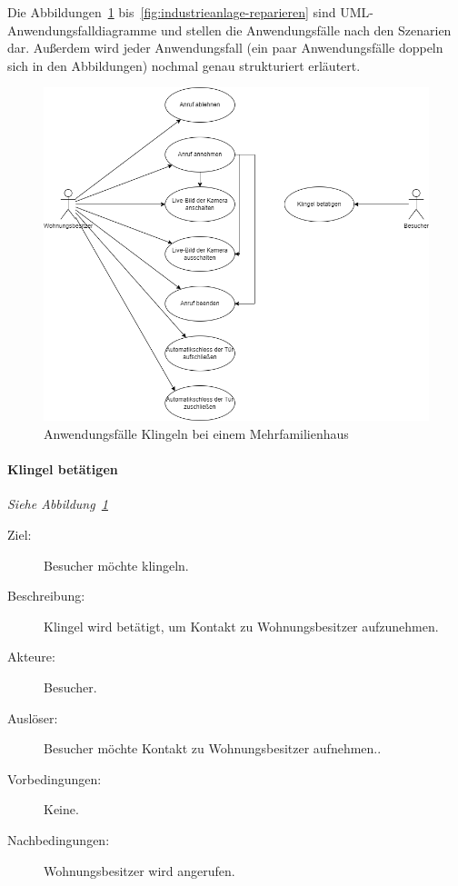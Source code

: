 Die Abbildungen~\ref{fig:klingeln-bei-einem-mehrfamilienhaus} bis~\ref{fig:industrieanlage-reparieren} sind UML-Anwendungsfalldiagramme und stellen die Anwendungsfälle nach den Szenarien dar.
Außerdem wird jeder Anwendungsfall (ein paar Anwendungsfälle doppeln sich in den Abbildungen) nochmal genau strukturiert erläutert.

\begin{figure}[ht!]
    \centering
    \includegraphics[width=\paperwidth-2in]{../assets/img/UML-Anwendungsfalldiagramme-Klingeln bei einem Mehrfamilienhaus}
    \caption{Anwendungsfälle Klingeln bei einem Mehrfamilienhaus}
    \label{fig:klingeln-bei-einem-mehrfamilienhaus}
\end{figure}

\paragraph{\large{Klingel betätigen}}
\textit{Siehe Abbildung~\ref{fig:klingeln-bei-einem-mehrfamilienhaus}}
    \begin{description}
        \item[Ziel:] Besucher möchte klingeln.
        \item[Beschreibung:] Klingel wird betätigt, um Kontakt zu Wohnungsbesitzer aufzunehmen.
        \item[Akteure:] Besucher.
        \item[Auslöser:] Besucher möchte Kontakt zu Wohnungsbesitzer aufnehmen..
        \item[Vorbedingungen:] Keine.
        \item[Nachbedingungen:] Wohnungsbesitzer wird angerufen.
    \end{description}

